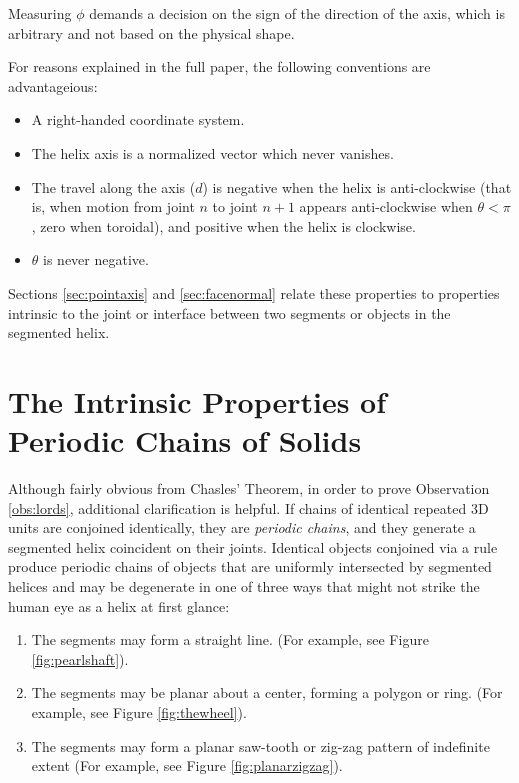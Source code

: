 \documentclass{svproc}
\begin{document}
Measuring $\phi$ demands a decision on the sign of the direction of the axis,
which is arbitrary and not based on the
physical shape.

For reasons explained in the full paper,
the following conventions are advantageious:
\begin{itemize}
\item A right-handed coordinate system.
\item The helix axis is a normalized vector
  which never vanishes.
\item The travel along the axis ($d$) is negative when
  the helix is anti-clockwise (that is, when motion from
  joint $n$ to joint $n+1$ appears anti-clockwise when $\theta < \pi$,
  zero when toroidal), and
  positive when the helix is clockwise.
\item $\theta$ is never negative.
\end{itemize}


Sections \ref{sec:pointaxis} and \ref{sec:facenormal}
relate these properties to properties intrinsic to the joint or interface between
two segments or objects in the segmented helix.

\label{sec:SegmentedHelix}

\section{The Intrinsic Properties of Periodic Chains of Solids}

Although fairly obvious from Chasles' Theorem, in order to prove Observation \ref{obs:lords},
additional clarification is helpful.
If chains of identical repeated 3D units are conjoined identically, they are {\em periodic chains},
and they generate a segmented helix coincident on their joints.
Identical objects conjoined via a rule
produce periodic chains of objects that are uniformly intersected
by segmented helices and may be degenerate in one of
three ways that might not strike the human eye as a helix at first glance:
\begin{enumerate}
\item The segments may form a straight line. (For example, see Figure \ref{fig:pearlshaft}).
\item The segments may be planar about a center, forming a polygon or ring. (For example, see Figure \ref{fig:thewheel}).
\item The segments may form a planar saw-tooth or zig-zag pattern of indefinite extent (For example, see Figure \ref{fig:planarzigzag}).
\end{enumerate}
\end{document}
